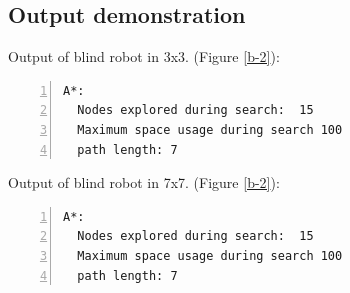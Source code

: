 \subsection{Output demonstration}

Output of blind robot in 3x3. (Figure \ref{b-2}):
\begin{lstlisting}[numbers=left]
A*:  
  Nodes explored during search:  15
  Maximum space usage during search 100
  path length: 7
\end{lstlisting}

Output of blind robot in 7x7. (Figure \ref{b-2}):
\begin{lstlisting}[numbers=left]
A*:  
  Nodes explored during search:  15
  Maximum space usage during search 100
  path length: 7
\end{lstlisting}

